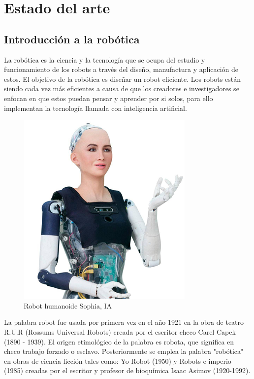 \chapter{Estado del arte}\label{CAP2}


\section{Introducción a la robótica}
    La robótica es la ciencia y la tecnología que se ocupa del estudio y funcionamiento de los robots a través del diseño, manufactura y aplicación de estos. El objetivo de la robótica es diseñar un robot eficiente. Los robots están siendo cada vez más eficientes a causa de que los creadores e investigadores se enfocan en que estos puedan pensar y aprender por si solos, para ello implementan la tecnología llamada con inteligencia artificial.
    
    \begin{figure}[htb]
        \centering
        \includegraphics[width=0.6\linewidth]{Main/Chapter2/Images2/Robot-humanoideSophiaIA.png}
        \caption{Robot humanoide Sophia, IA}
        \label{f:Cap2_general_1}
    \end{figure}   
    
    La palabra robot fue usada por primera vez en el año 1921 en la obra de teatro R.U.R (Rossums Universal Robots) creada por el escritor checo Carel Capek (1890 - 1939). El origen etimológico de la palabra es robota, que significa en checo trabajo forzado o esclavo. Posteriormente se emplea la palabra "robótica" en obras de ciencia ficción tales como: Yo Robot (1950) y Robots e imperio (1985) creadas por el escritor y profesor de bioquímica Isaac Asimov (1920-1992).
    

